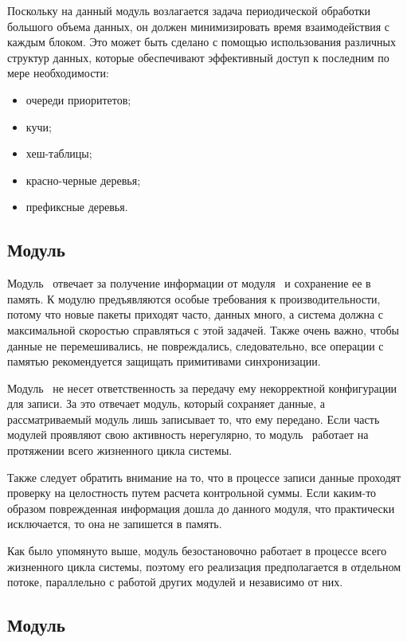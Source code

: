 Поскольку на данный модуль возлагается задача периодической обработки большого объема данных, он должен минимизировать время взаимодействия с каждым блоком. Это может быть сделано с помощью использования различных структур данных, которые обеспечивают эффективный доступ к последним по мере необходимости:
\begin{itemize}
    \item очереди приоритетов;
    \item кучи;
    \item хеш-таблицы;
    \item красно-черные деревья;
    \item префиксные деревья.
\end{itemize}

\subsection{Модуль \moduleDataStoring}

Модуль \moduleDataStoring\ отвечает за получение информации от модуля \moduleProcessPackets\ и сохранение ее в память. К модулю предъявляются особые требования к производительности, потому что новые пакеты приходят часто, данных много, а система должна с максимальной скоростью справляться с этой задачей. Также очень важно, чтобы данные не перемешивались, не повреждались, следовательно, все операции с памятью рекомендуется защищать примитивами синхронизации.

Модуль \moduleDataStoring\ не несет ответственность за передачу ему некорректной конфигурации для записи. За это отвечает модуль, который сохраняет данные, а рассматриваемый модуль лишь записывает то, что ему передано. Если часть модулей проявляют свою активность нерегулярно, то модуль \moduleDataStoring\ работает на протяжении всего жизненного цикла системы.

Также следует обратить внимание на то, что в процессе записи данные проходят проверку на целостность путем расчета контрольной суммы. Если каким-то образом поврежденная информация дошла до данного модуля, что практически исключается, то она не запишется в память.

Как было упомянуто выше, модуль безостановочно работает в процессе всего жизненного цикла системы, поэтому его реализация предполагается в отдельном потоке, параллельно с работой других модулей и независимо от них.

\subsection{Модуль \moduleOsal}


